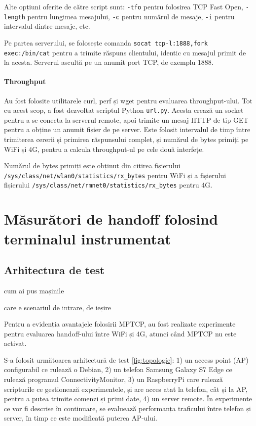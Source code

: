 Alte opțiuni oferite de către script sunt: \texttt{-tfo} pentru folosirea TCP Fast Open,  \texttt{-length} pentru lungimea mesajului, \texttt{-c} pentru numărul de mesaje, \texttt{-i} pentru intervalul dintre mesaje, etc.

Pe partea serverului, se folosește comanda \texttt{socat tcp-l:1888,fork exec:/bin/cat} pentru a trimite răspuns clientului, identic cu mesajul primit de la acesta. Serverul ascultă pe un anumit port TCP, de exemplu 1888.

\subsubsection{Throughput}

Au fost folosite utilitarele curl, perf și wget pentru evaluarea throughput-ului. Tot cu acest scop, a fost dezvoltat scriptul Python \texttt{url.py}. Acesta crează un socket pentru a se conecta la serverul remote, apoi trimite un mesaj HTTP de tip GET pentru a obține un anumit fișier de pe server. Este folosit intervalul de timp între trimiterea cererii și primirea răspunsului complet, și numărul de bytes primiți pe WiFi și 4G, pentru a calcula throughput-ul pe cele două interfețe. 

Numărul de bytes primiți este obținut din citirea fișierului \texttt{/sys/class/net/wlan0/statistics/rx\_bytes} pentru WiFi și a fișierului fișierului \texttt{/sys/class/net/rmnet0/statistics/rx\_bytes} pentru 4G.

\chapter{Măsurători de handoff folosind terminalul instrumentat}

\section{Arhitectura de test}
cum ai pus mașinile

care e scenariul de intrare, de ieșire

Pentru a evidenția avantajele folosirii MPTCP, au fost realizate experimente pentru evaluarea handoff-ului între WiFi și 4G, atunci când MPTCP nu este activat.

S-a folosit următoarea arhitectură de test \ref{fig:topologie}: 1) un access point (AP) configurabil ce rulează o Debian, 2) un telefon Samsung Galaxy S7 Edge ce rulează programul ConnectivityMonitor, 3) un RaspberryPi care rulează scripturile ce gestionează experimentele, și are acces atat la telefon, cât și la AP, pentru a putea trimite comenzi și primi date, 4) un server remote. În experimente ce vor fi descrise în continuare, se evaluează performanța traficului între telefon și server, în timp ce este modificată puterea AP-ului. 

